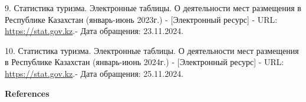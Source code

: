 \begin{references}
9. Статистика туризма. Электронные таблицы. О деятельности мест
размещения в Республике Казахстан (январь-июнь 2023г.) - {[}Электронный
ресурс{]} - URL:
\href{https://stat.gov.kz/ru/industries/business-statistics/stat-tourism/spreadsheets/?year=2023&name}{https://stat.gov.kz}.-
Дата обращения: 23.11.2024.

10. Статистика туризма. Электронные таблицы. О деятельности мест
размещения в Республике Казахстан (январь-июнь 2024г.) - {[}Электронный
ресурс{]} - URL:
\href{https://stat.gov.kz/ru/industries/business-statistics/stat-tourism/spreadsheets/?year=2024&name}{https://stat.gov.kz}.-
Дата обращения: 25.11.2024.
\end{references}

\begin{center}
{\bfseries References}
\end{center}

